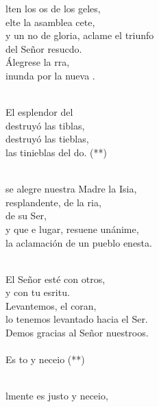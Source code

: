 \begin{cancion}%
	lten los os de los geles,\\
	elte la asamblea cete,\\
	y un no de gloria, aclame el triunfo\\
	del Señor resucdo.\\
	Álegrese la rra,\\
	inunda por la nueva .\\\jump\\
	\begin{chorus}%
	El esplendor del \\
	destruyó las tiblas,\\
	destruyó las tieblas,\\
	las tinieblas del do. (**)\\
	\end{chorus}%
	\jump\\
	 se alegre nuestra Madre la Isia,\\
	resplandente, de la ria,\\
	de su Ser,\\
	y que e lugar, resuene unánime,\\
	la aclamación de un pueblo enesta.\\\jump\\
	\begin{chorus}%
	El Señor esté con otros,\\
	y con tu esritu.\\
	Levantemos, el coran,\\
	lo tenemos levantado hacia el Ser.\\
	Demos gracias al Señor nuestroos.\\
\jump\\
	Es to y neceio (**)\\
	\end{chorus}%
	\jump\\
	lmente es justo y neceio,\\

\end{cancion}

